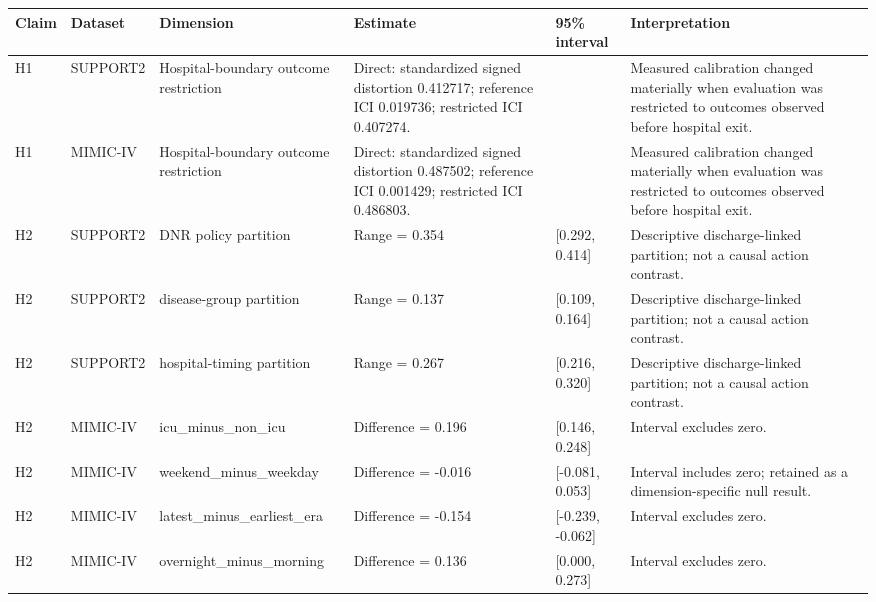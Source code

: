 \begin{tabular}{llllll}
\toprule
Claim & Dataset & Dimension & Estimate & 95\% interval & Interpretation \\
\midrule
H1 & SUPPORT2 & Hospital-boundary outcome restriction & Direct: standardized signed distortion 0.412717; reference ICI 0.019736; restricted ICI 0.407274. &  & Measured calibration changed materially when evaluation was restricted to outcomes observed before hospital exit. \\
H1 & MIMIC-IV & Hospital-boundary outcome restriction & Direct: standardized signed distortion 0.487502; reference ICI 0.001429; restricted ICI 0.486803. &  & Measured calibration changed materially when evaluation was restricted to outcomes observed before hospital exit. \\
H2 & SUPPORT2 & DNR policy partition & Range = 0.354 & [0.292, 0.414] & Descriptive discharge-linked partition; not a causal action contrast. \\
H2 & SUPPORT2 & disease-group partition & Range = 0.137 & [0.109, 0.164] & Descriptive discharge-linked partition; not a causal action contrast. \\
H2 & SUPPORT2 & hospital-timing partition & Range = 0.267 & [0.216, 0.320] & Descriptive discharge-linked partition; not a causal action contrast. \\
H2 & MIMIC-IV & icu\_minus\_non\_icu & Difference = 0.196 & [0.146, 0.248] & Interval excludes zero. \\
H2 & MIMIC-IV & weekend\_minus\_weekday & Difference = -0.016 & [-0.081, 0.053] & Interval includes zero; retained as a dimension-specific null result. \\
H2 & MIMIC-IV & latest\_minus\_earliest\_era & Difference = -0.154 & [-0.239, -0.062] & Interval excludes zero. \\
H2 & MIMIC-IV & overnight\_minus\_morning & Difference = 0.136 & [0.000, 0.273] & Interval excludes zero. \\
\bottomrule
\end{tabular}
